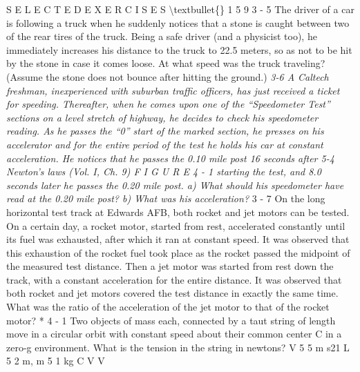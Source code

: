\documentclass[10pt,oneside]{article}
\begin{document}
S E L E C T E D  E X E R C I S E S \textbackslash{}textbullet\{\} 1 5 9 \emph{ } 3 - 5 The driver of a car is following a truck when he suddenly notices that a stone is caught between two of the rear tires of the truck. Being a safe driver (and a physicist too), he immediately increases his distance to the truck to 22.5 meters, so as not to be hit by the stone in case it comes loose. At what speed was the truck traveling? (Assume the stone does not bounce after hitting the ground.) \emph{ } \emph{ 3-6 A Caltech freshman, inexperienced with suburban traffic officers, has just received a ticket for speeding. Thereafter, when he comes upon one of the “Speedometer Test” sections on a level stretch of highway, he decides to check his speedometer reading. As he passes the “0” start of the marked section, he presses on his accelerator and for the entire period of the test he holds his car at constant acceleration. He notices that he passes the 0.10 mile post 16 seconds after 5-4 Newton’s laws (Vol. I, Ch. 9) F I G U R E  4 - 1 starting the test, and 8.0 seconds later he passes the 0.20 mile post. a) What should his speedometer have read at the 0.20 mile post? b) What was his acceleration? } \emph{ } 3 - 7 On the long horizontal test track at Edwards AFB, both rocket and jet motors can be tested. On a certain day, a rocket motor, started from rest, accelerated constantly until its fuel was exhausted, after which it ran at constant speed. It was observed that this exhaustion of the rocket fuel took place as the rocket passed the midpoint of the measured test distance. Then a jet motor was started from rest down the track, with a constant acceleration for the entire distance. It was observed that both rocket and jet motors covered the test distance in exactly the same time. What was the ratio of the acceleration of the jet motor to that of the rocket motor? * 4 - 1 Two objects of mass each, connected by a taut string of length move in a circular orbit with constant speed about their common center C in a zero-g environment. What is the tension in the string in newtons? V 5 5 m s21 L 5 2 m, m 5 1 kg C V V\par
\end{document}
